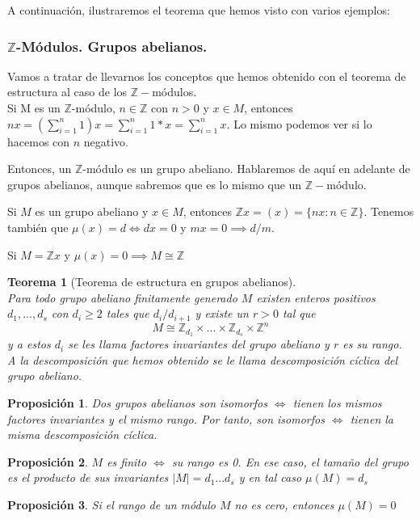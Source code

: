 \documentclass[11pt, a4paper, titlepage]{article}
\providecommand{\ent}{\mathbb{Z}}
\theoremstyle{theorem-style}
\newtheorem*{nth}{Teorema}
\newtheorem*{nprop}{Proposición}
\theoremstyle{definition-style}
\theoremstyle{remark-style}
\theoremstyle{example-style}
\begin{document}
A continuación, ilustraremos el teorema que hemos visto con varios ejemplos:

\subsubsection{$\ent$-Módulos. Grupos abelianos.}

Vamos a tratar de llevarnos los conceptos que hemos obtenido con el teorema de estructura al caso de los $\ent-$módulos.\\
Si M es un $\ent$-módulo, $n\in \ent$ con $n>0$ y $x\in M$, entonces $nx = (\sum_{i=1}^n 1)x = \sum_{i=1}^n 1*x = \sum_{i=1}^n x$. Lo mismo podemos ver si lo hacemos con $n$ negativo.

Entonces, un $\ent$-módulo es un grupo abeliano. Hablaremos de aquí en adelante de grupos abelianos, aunque sabremos que es lo mismo que un $\ent-$módulo.

Si $M$ es un grupo abeliano y $x\in M$, entonces $\ent x = (x) = \{nx : n \in \ent  \}$.
Tenemos también que $\mu(x) = d \iff dx = 0$ y $mx = 0 \implies d/m$.

Si $M=\ent x$ y $\mu(x) = 0 \implies M \cong \ent$

\begin{nth}[Teorema de estructura en grupos abelianos]\hfill \\
	Para todo grupo abeliano finitamente generado $M$ existen enteros positivos $d_1,...,d_s$ con $d_i \geq 2$ tales que $d_i/d_{i+1}$ y existe un $r> 0$ tal que 
	\[
	M \cong \ent_{d_1} \times ... \times \ent_{d_s} \times \ent^n
	\]
	y a estos $d_i$ se les llama factores invariantes del grupo abeliano y $r$ es su rango.
	A la descomposición que hemos obtenido se le llama descomposición cíclica del grupo abeliano.
\end{nth}

\begin{nprop}
	Dos grupos abelianos son isomorfos $\iff$ tienen los mismos factores invariantes y el mismo rango. Por tanto, son isomorfos $\iff$ tienen la misma descomposición cíclica.
\end{nprop}

\begin{nprop}
	$M$ es finito $\iff$ su rango es 0. En ese caso, el tamaño del grupo es el producto de sus invariantes  $|M| = d_1...d_s$ y en tal caso $\mu(M) = d_s$
\end{nprop}
\begin{nprop}
	Si el rango de un módulo $M$ no es cero, entonces $\mu(M) =0$
\end{nprop}
\end{document}
